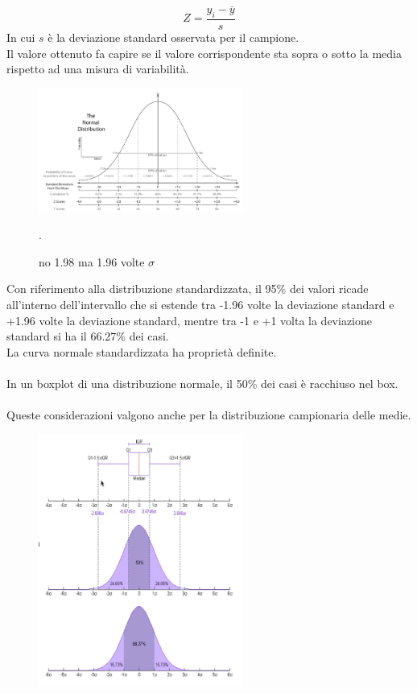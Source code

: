 \documentclass[10pt, draft]{book}
\begin{document}
\begin{equation}
    Z = \frac{y_i - \overline{y}}{s}
\end{equation}
In cui $s$ è la deviazione standard osservata per il campione.
\\
Il valore ottenuto fa capire se il valore corrispondente sta sopra o sotto la media rispetto ad una misura di variabilità.
\begin{figure}[h]\label{standardizednormalcurve}
    \centering
    \includegraphics[width=0.6\textwidth]{standardizednormalcurve}
    \caption{\small{no 1.98 ma 1.96 volte $\sigma$}}.
\end{figure}
Con riferimento alla distribuzione standardizzata, il 95\% dei valori ricade all’interno dell’intervallo che si estende tra -1.96 volte la deviazione standard e +1.96 volte la deviazione standard, mentre tra -1 e +1 volta la deviazione standard si ha il 66.27\% dei casi.
\\
La curva normale standardizzata ha proprietà definite.
\\
\\
In un boxplot di una distribuzione normale, il 50\% dei casi è racchiuso nel box.
\\
\\
Queste considerazioni valgono anche per la distribuzione campionaria delle medie.
\begin{figure}[h]\label{standardizednormalcurve2}
    \centering
    \includegraphics[width=0.6\textwidth]{standardizednormalcurve2}
    \caption{\small{}}
\end{figure}
\end{document}
